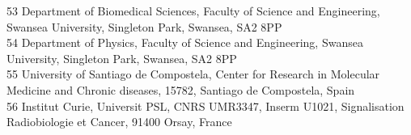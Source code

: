 {\begin{tabbing}
     53 \> Department of Biomedical Sciences, Faculty of Science and Engineering, Swansea University, Singleton Park, Swansea, SA2 8PP\\
     54 \> Department of Physics, Faculty of Science and Engineering, Swansea University, Singleton Park, Swansea, SA2 8PP\\
     55 \> University of Santiago de Compostela, Center for Research in Molecular Medicine and Chronic diseases, 15782, Santiago de Compostela, Spain\\
     56 \> Institut Curie, Universit PSL, CNRS UMR3347, Inserm U1021, Signalisation Radiobiologie et Cancer, 91400 Orsay, France\\
    ~   \> \\
  \end{tabbing}
}
